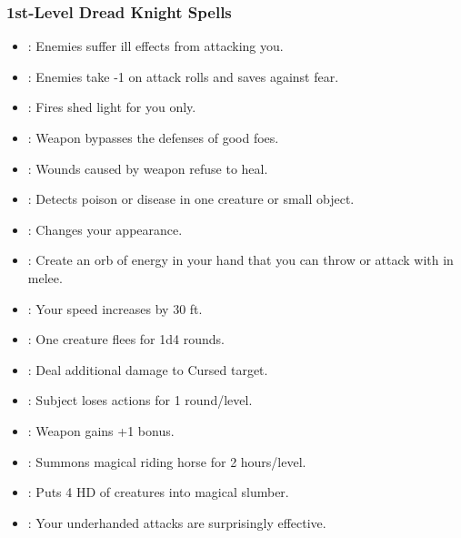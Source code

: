 \subsubsection{1st-Level Dread Knight Spells}
\begin{itemize}
\item {}: Enemies suffer ill effects from attacking you.
\item {}: Enemies take -1 on attack rolls and saves against fear.
\item {}: Fires shed light for you only.
\item {}: Weapon bypasses the defenses of good foes.
\item {}: Wounds caused by weapon refuse to heal.
\item {}: Detects poison or disease in one creature or small object.
\item {}: Changes your appearance.
\item {}: Create an orb of energy in your hand that you can throw or attack with in melee.
\item {}: Your speed increases by 30 ft.
\item {}: One creature flees for 1d4 rounds.
\item {}: Deal additional damage to Cursed target.
\item {}: Subject loses actions for 1 round/level.
\item {}: Weapon gains +1 bonus.
\item {}: Summons magical riding horse for 2 hours/level.
\item {}: Puts 4 HD of creatures into magical slumber.
\item {}: Your underhanded attacks are surprisingly effective.
\end{itemize}
